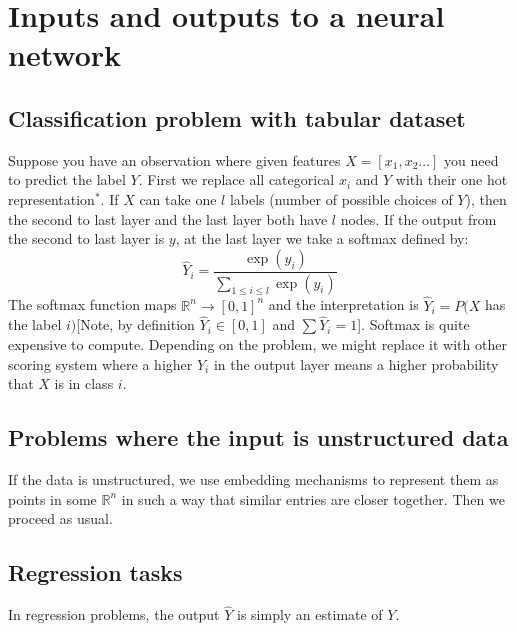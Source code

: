 \section{Inputs and outputs to a neural network}
\subsection{Classification problem with tabular dataset}
Suppose you have an observation where given features $X=[x_1,x_2\hdots]$ you need to predict the label $Y$. First we replace all categorical $x_i$ and $Y$ with their one hot representation$^{*}$. If $X$ can take  one $l$ labels (number of possible choices of $Y$), then the second to last layer and the last layer both  have $l$ nodes. If the output from the second to last layer is $y$, at the last layer we take a softmax defined by:
$$\hat Y_i=\frac{\exp(y_i)}{\sum_{1\leq i\leq l}\exp(y_i)}$$
The softmax function maps $\mathbb R^n\to [0,1]^n$ and the interpretation is $\hat Y_i=P(X$ has the label $i)$[Note, by definition $\hat Y_i\in[0,1]$ and  $\sum \hat Y_i=1$]. Softmax is quite expensive to compute. Depending on the problem, we might replace it with other scoring system where a higher $\hat Y_i$ in the output layer means a higher probability that $X$ is in class $i$.

\subsection{Problems where the input is unstructured data}
If the data is unstructured, we use embedding mechanisms to represent them as points in some $\mathbb R^n$ in such a way that similar entries are closer together. Then we proceed as usual. 
\subsection{Regression tasks}
In regression problems, the output $\hat Y$ is simply an estimate of $Y$.


